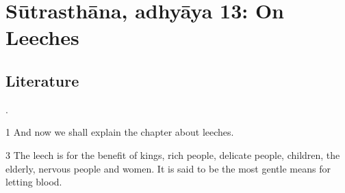 
\section{Sūtrasthāna, adhyāya 13:  On Leeches}


\subsection{Literature}
\cites[IA, 209]{meul-hist}. 

\begin{translation}    
\item [1] 
    And now we shall explain the chapter about leeches.
    
\item [3] The leech is for the benefit of kings, rich people, delicate people,
children, the elderly, nervous people and women.  It is said to be the most
gentle means for letting blood.

    
\end{translation}



